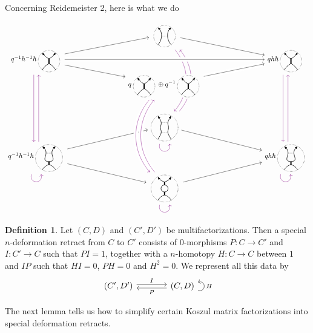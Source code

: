 \documentclass{article}
\newcommand{\sdr}[5]{%
  \begin{tikzcd}[column sep=large, ampersand replacement=\&]
    {#1} \arrow[r, "#3", shift left=0.5ex,] \arrow[r, leftarrow, "#4", shift right=0.5ex, swap] \& 
    {#2} \arrow[loop right, distance=1em, in=15, out=-15, "#5",swap]
  \end{tikzcd}%
}
\theoremstyle{plain} %
\theoremstyle{definition} %
\newtheorem{definition}[theorem]{Definition}
\theoremstyle{remark} %
\begin{document}
Concerning Reidemeister 2, here is what we do

\[\label{r2sdr}
\begin{tikzcd}[row sep=-0.1cm, column sep=3cm]
& 
\scalebox{0.7}{\ThinEdge{}{}{}{}}
\arrow[dr]
\arrow[ddd, bend left=40, color=violet, shift right=1.5, dash pattern=on 40pt off 35pt]
\arrow[leftarrow, ddd, bend left=40, color=violet, shift left=1.5, dash pattern=on 39.5pt off 37pt]
&
\\
q^{-1}h^{-1}\hslash\scalebox{0.7}{\ThickEdge{}{}{}{}} 
\arrow[dr]
\arrow[ur]
\arrow[ddd, color=violet, shift right=1.5]
&
&
qh\hslash\scalebox{0.7}{\ThickEdge{}{}{}{}}
\arrow[ddd, color=violet, shift right=1.5]
\\
& 
q\scalebox{0.7}{\ThickEdge{}{}{}{}}\oplus q^{-1}\scalebox{0.7}{\ThickEdge{}{}{}{}}
\arrow[ur, crossing over] 
&
\\[2em]
& 
\scalebox{0.7}{\ThinThin{}{}{}{}{}}
\arrow[loop right, distance=1.5em, in=-75, out=-105, color=violet]
\arrow[dr]
&
\\
q^{-1}h^{-1}\hslash\scalebox{0.7}{\ThinThick{}{}{}{}{}} 
\arrow[loop right, distance=1.5em, in=-75, out=-105, color=violet]
\arrow[ur]
\arrow[dr]
\arrow[uuu, color=violet, shift right=1.5]
&& 
qh\hslash\scalebox{0.7}{\ThinThick{}{}{}{}{}}
\arrow[uuu, color=violet, shift right=1.5]
\arrow[loop right, distance=1.5em, in=-75, out=-105, color=violet]
\\
& 
\scalebox{0.7}{\Bigon{}{}{}{}{}} 
\arrow[ur]
\arrow[loop right, distance=1.5em, in=-75, out=-105, color=violet] 
&
\arrow[ddd, from=3-2, to=6-2, bend right=40, crossing over, color=violet, shift right=1.5] 
\arrow[uuu, from=6-2, to=3-2, bend left=40, crossing over, color=violet, shift right=1.5] 
\arrow[ur, from=3-2, to=2-3, crossing over] 
\arrow[rr, from=2-1, to=2-3, crossing over] 
\end{tikzcd}
\]


\begin{definition}
Let $(C,D)$ and $(C',D')$ be multifactorizations. Then a special $n$-deformation retract from $C$ to $C'$ consists of 0-morphisms $P:C\to C'$ and $I:C'\to C$ such that $PI=1$, together with a $n$-homotopy $H:C\to C$ between $1$ and $IP$ such that $HI=0$, $PH=0$ and $H^2=0$. We represent all this data by
$$\sdr{(C',D')}{(C,D)}{I}{P}{H}$$
\end{definition}

The next lemma tells us how to simplify certain Koszul matrix factorizations into special deformation retracts.
\end{document}
